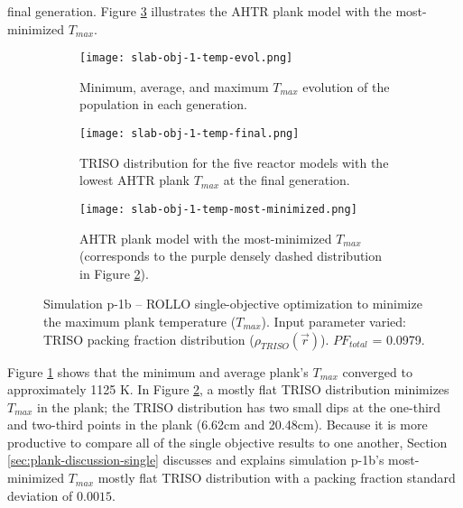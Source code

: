 final generation. 
Figure \ref{fig:slab-obj-1-temp-most-minimized} illustrates the \gls{AHTR} plank model 
with the most-minimized $T_{max}$. 
\begin{figure}[htbp!]
    \centering
    \begin{subfigure}{0.9\textwidth}
        \texttt{[image: slab-obj-1-temp-evol.png]}
        \caption{Minimum, average, and maximum $T_{max}$ evolution of the 
        population in each generation.}
        \label{fig:slab-obj-1-temp-evol} 
    \end{subfigure}
    \begin{subfigure}{0.9\textwidth}
        \texttt{[image: slab-obj-1-temp-final.png]}
        \caption{TRISO distribution for the five reactor models with the 
        lowest AHTR plank $T_{max}$ at the final generation.}
        \label{fig:slab-obj-1-temp-final} 
    \end{subfigure}
    \begin{subfigure}{0.9\textwidth}
        \texttt{[image: slab-obj-1-temp-most-minimized.png]}
        \caption{\gls{AHTR} plank model with the most-minimized $T_{max}$
        (corresponds to the purple densely dashed distribution in Figure 
        \ref{fig:slab-obj-1-temp-final}).}
        \label{fig:slab-obj-1-temp-most-minimized} 
    \end{subfigure}
    \caption{Simulation p-1b -- ROLLO single-objective optimization to minimize 
    the maximum plank temperature ($T_{max}$). Input parameter varied: TRISO 
    packing fraction distribution ($\rho_{TRISO}(\vec{r})$). $PF_{total}$ = 0.0979.}
    \label{fig:slab-obj-1-temp}
\end{figure}
Figure \ref{fig:slab-obj-1-temp-evol} shows that the minimum and average plank's 
$T_{max}$ converged to approximately 1125 K. 
In Figure \ref{fig:slab-obj-1-temp-final}, a mostly flat TRISO
distribution minimizes $T_{max}$ in the plank; the TRISO distribution 
has two small dips at the one-third and two-third points in the plank 
(6.62cm and 20.48cm). 
Because it is more productive to compare all of the single objective results to one 
another, Section \ref{sec:plank-discussion-single} discusses and explains simulation 
p-1b's most-minimized $T_{max}$ mostly flat TRISO distribution with a packing fraction 
standard deviation of $0.0015$. 

